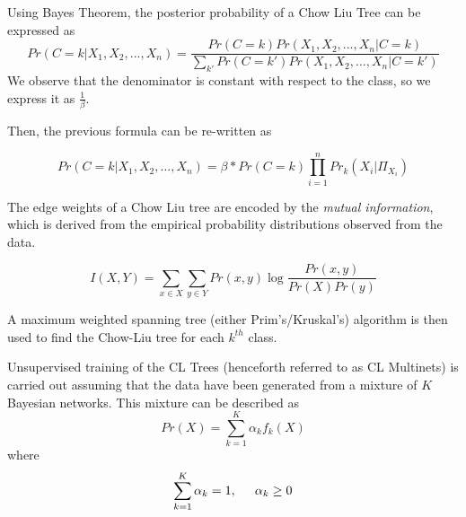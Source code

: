 Using Bayes Theorem, the posterior probability of a Chow Liu Tree can be expressed as
 \begin{equation}
         Pr(C=k|X_1,X_2,...,X_n) =\frac{ Pr(C=k)Pr(X_1,X_2,...,X_n|C=k)}{\sum_{k'}Pr(C=k')Pr(X_1,X_2,...,X_n | C = k')}
 \end{equation}
We observe that the denominator is constant with respect to the class, so we express it as $\frac{1}{\beta}$. 
 
Then, the previous formula can be re-written as
 
\begin{equation}
    Pr(C=k|X_1,X_2,...,X_n) = \beta*Pr(C=k)\prod_{i=1}^{n} Pr_k(X_i | \Pi_{X_i})
\end{equation}
 
The edge weights of a Chow Liu tree are encoded by the \textit{mutual information}, which is derived from the empirical probability distributions observed from the data.
 
 \begin{equation}
     I(X,Y) = \sum_{x \in X} \sum_{y \in Y} Pr(x,y) \log \frac{Pr(x,y)}{Pr(X)Pr(y)}
 \end{equation}
 
 A maximum weighted spanning tree (either Prim's/Kruskal's) algorithm is then used to find the Chow-Liu tree for each $k^{th}$ class.
 
 Unsupervised training of the CL Trees (henceforth referred to as CL Multinets) is carried out assuming that the data have been generated from a mixture of $K$ Bayesian networks. This mixture can be described as 
 \begin{equation}
     Pr(X) = \sum_{k=1}^{K} \alpha_k f_k(X)
 \end{equation}
where 
\begin{equation}
    \sum_{k=1}^{K} \alpha_k = 1, \hspace{0.5cm}\alpha_k \geq 0
\end{equation}

